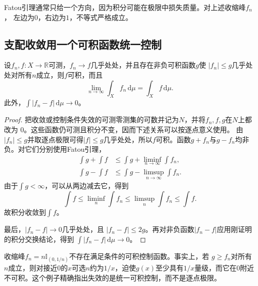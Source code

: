Fatou引理通常只给一个方向，因为积分可能在极限中损失质量。对上述收缩峰$f_n$， 左边为$0$，右边为$1$，不等式严格成立。
\subsection{支配收敛用一个可积函数统一控制}
\begin{theorem}[支配收敛定理]
\label{thm:analysis-dominated-convergence}
设$f_n,f:X\to\mathbb{R}$可测，$f_n\to f$几乎处处，并且存在非负可积函数$g$使
$|f_n|\leq g$几乎处处对所有$n$成立，则$f$可积，而且
\[   \lim_{n\to\infty}\int_Xf_n\,\mathrm{d}\mu   =   \int_Xf\,\mathrm{d}\mu. \]
此外，$\int|f_n-f|\,\mathrm{d}\mu\to0$。
\end{theorem}
\begin{proof}
把收敛或控制条件失效的可测零测集的可数并记为$N$，并将$f_n,f,g$在$N$上都改为
$0$。这些函数仍可测且积分不变，因而下述关系可以按逐点意义使用。
由$|f_n|\leq g$并取逐点极限可得$|f|\leq g$几乎处处，所以$f$可积。函数$g+f_n$与$g-f_n$均非负。对它们分别使用Fatou引理，
\begin{align*}
  \int g+\int f
  &\leq
  \int g+\liminf_{n\to\infty}\int f_n,\\
  \int g-\int f
  &\leq
  \int g-\limsup_{n\to\infty}\int f_n.
\end{align*}
由于$\int g<\infty$，可以从两边减去它，得到
\[   \int f   \leq\liminf_n\int f_n   \leq\limsup_n\int f_n   \leq\int f. \]
故积分收敛到$\int f$。

最后，$|f_n-f|\to0$几乎处处，且 $|f_n-f|\leq2g$。再对非负函数$|f_n-f|$应用刚证明的积分交换结论，得到 $\int|f_n-f|\,\mathrm{d}\mu\to0$。
\end{proof}

收缩峰$f_n=n\mathbb{I}_{(0,1/n)}$不存在满足条件的可积控制函数。事实上，若 $g\geq f_n$对所有$n$成立，则对接近$0$的$x$可选$n$约为$1/x$，迫使$g(x)$至少具有$1/x$量级，而它在$0$附近不可积。这个例子精确指出失效的是统一可积控制，而不是逐点极限。
